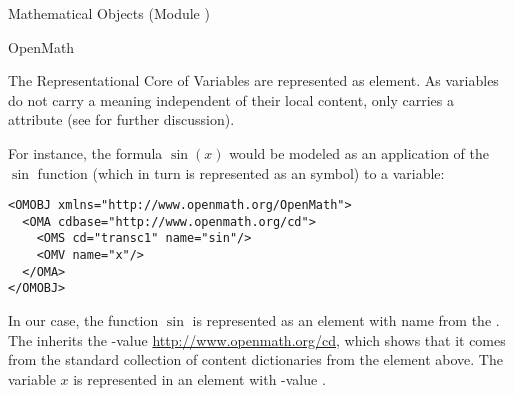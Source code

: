 \begin{tchapter}[id=mobj,short=Mathematical Objects]{Mathematical Objects (Module {})}
\begin{tsection}[id=openmath]{OpenMath}
\begin{tsubsection}[id=om:core]{The Representational Core of {\openmath}}
Variables are represented as {} element.  As variables do not
carry a meaning independent of their local content, {} only
carries a {} attribute (see {} for
further discussion).

For instance, the formula $\sin(x)$ would be modeled as an application of the
$\sin$ function (which in turn is represented as an {\openmath} symbol) to a
variable:
\begin{lstlisting}[label=sinx,language=OpenMath,numbers=none,
   index={OMOBJ,OMA,OMV,OMS}]
<OMOBJ xmlns="http://www.openmath.org/OpenMath">
  <OMA cdbase="http://www.openmath.org/cd">
    <OMS cd="transc1" name="sin"/>
    <OMV name="x"/>
  </OMA>
</OMOBJ>   
\end{lstlisting}

In our case, the function $\sin$ is represented as an {} element
with name {} from the {}
{}. The {} inherits the
{}-value \url{http://www.openmath.org/cd}, which shows that it
comes from the {\openmath} standard collection of content dictionaries from the
{} element above.  The variable $x$ is represented in an
{} element with {}-value
{}.


\end{tsubsection}
\end{tsection}
\end{tchapter}
